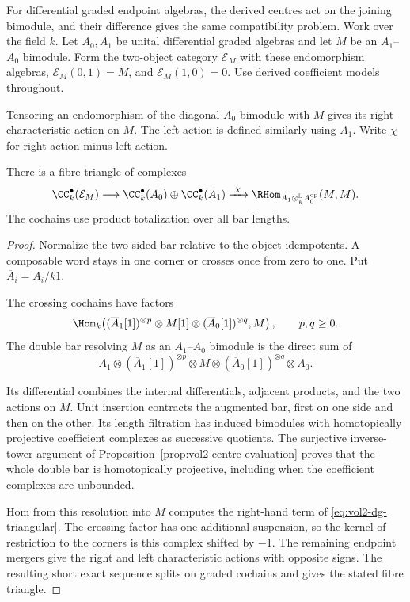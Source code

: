 For differential graded endpoint algebras, the derived centres
act on the joining bimodule, and their difference gives the same
compatibility problem. Work over the field $k$. Let $A_0,A_1$
be unital differential graded algebras and let $M$ be an
$A_1$--$A_0$ bimodule. Form the two-object category
$\mathcal E_M$ with these endomorphism algebras,
$\mathcal E_M(0,1)=M$, and $\mathcal E_M(1,0)=0$.
Use derived coefficient models throughout.

Tensoring an endomorphism of the diagonal $A_0$-bimodule with
$M$ gives its right characteristic action on $M$.
The left action is defined similarly using $A_1$.
Write $\chi$ for right action minus left action.

\begin{proposition}\label{prop:vol2-dg-triangular}
There is a fibre triangle of complexes
\begin{equation}\label{eq:vol2-dg-triangular}
 \CC_k^\bullet(\mathcal E_M)\longrightarrow
 \CC_k^\bullet(A_0)\oplus\CC_k^\bullet(A_1)
 \xrightarrow{\ \chi\ }
 \RHom_{A_1\otimes_k^{\mathbb L}A_0^{\mathrm{op}}}(M,M).
\end{equation}
The cochains use product totalization over all bar lengths.
\end{proposition}

\begin{proof}
Normalize the two-sided bar relative to the object idempotents.
A composable word stays in one corner or crosses once from
zero to one. Put $\overline A_i=A_i/k1$.

The crossing cochains have factors
\[
 \Hom_k\!\left(
 (\overline A_1[1])^{\otimes p}\otimes M[1]\otimes
 (\overline A_0[1])^{\otimes q},M\right),
 \qquad p,q\ge0.
\]
The double bar resolving $M$ as an $A_1$--$A_0$ bimodule
is the direct sum of
\[
 A_1\otimes(\overline A_1[1])^{\otimes p}\otimes M
\otimes(\overline A_0[1])^{\otimes q}\otimes A_0.
\]

Its differential combines the internal differentials,
adjacent products, and the two actions on $M$.
Unit insertion contracts the augmented bar, first on one side
and then on the other. Its length filtration has induced
bimodules with homotopically projective coefficient complexes
as successive quotients. The surjective inverse-tower argument
of Proposition~\ref{prop:vol2-centre-evaluation} proves that
the whole double bar is homotopically projective, including
when the coefficient complexes are unbounded.

Hom from this resolution into $M$ computes the right-hand term
of \eqref{eq:vol2-dg-triangular}. The crossing factor has one
additional suspension, so the kernel of restriction to the
corners is this complex shifted by $-1$.
The remaining endpoint mergers give the right and left
characteristic actions with opposite signs. The resulting
short exact sequence splits on graded cochains and gives the
stated fibre triangle.
\end{proof}

